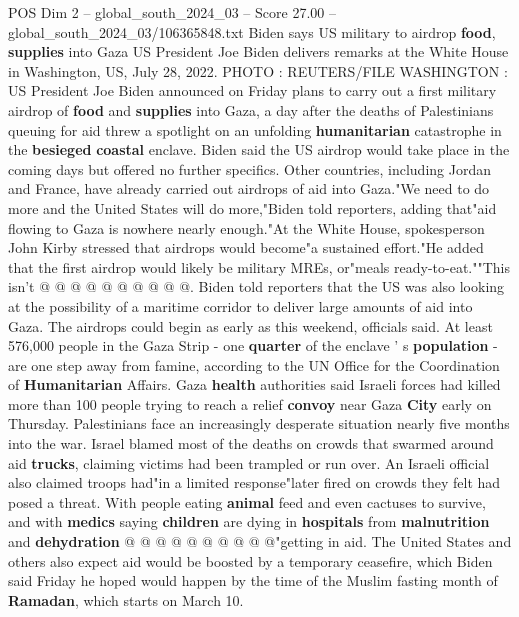 \begin{textsample}{POS Dim 2 – global\_south\_2024\_03 – Score 27.00 – global\_south\_2024\_03/106365848.txt}  \label{ex:f2_pos_010}
Biden says US military to airdrop \textbf{food}, \textbf{supplies} into Gaza US President Joe Biden delivers remarks at the White House in Washington, US, July 28, 2022.
PHOTO : REUTERS/FILE WASHINGTON : US President Joe Biden announced on Friday plans to carry out a first military airdrop of \textbf{food} and \textbf{supplies} into Gaza, a day after the deaths of Palestinians queuing for aid threw a spotlight on an unfolding \textbf{humanitarian} catastrophe in the \textbf{besieged} \textbf{coastal} enclave.
Biden said the US airdrop would take place in the coming days but offered no further specifics.
Other countries, including Jordan and France, have already carried out airdrops of aid into Gaza."We need to do more and the United States will do more,"Biden told reporters, adding that"aid flowing to Gaza is nowhere nearly enough."At the White House, spokesperson John Kirby stressed that airdrops would become"a sustained effort."He added that the first airdrop would likely be military MREs, or"meals ready-to-eat.""This isn't @ @ @ @ @ @ @ @ @ @.
Biden told reporters that the US was also looking at the possibility of a maritime corridor to deliver large amounts of aid into Gaza.
The airdrops could begin as early as this weekend, officials said.
At least 576,000 people in the Gaza Strip - one \textbf{quarter} of the enclave ' s \textbf{population} - are one step away from famine, according to the UN Office for the Coordination of \textbf{Humanitarian} Affairs.
Gaza \textbf{health} authorities said Israeli forces had killed more than 100 people trying to reach a relief \textbf{convoy} near Gaza \textbf{City} early on Thursday.
Palestinians face an increasingly desperate situation nearly five months into the war.
Israel blamed most of the deaths on crowds that swarmed around aid \textbf{trucks}, claiming victims had been trampled or run over.
An Israeli official also claimed troops had"in a limited response"later fired on crowds they felt had posed a threat.
With people eating \textbf{animal} feed and even cactuses to survive, and with \textbf{medics} saying \textbf{children} are dying in \textbf{hospitals} from \textbf{malnutrition} and \textbf{dehydration} @ @ @ @ @ @ @ @ @ @"getting in aid.
The United States and others also expect aid would be boosted by a temporary ceasefire, which Biden said Friday he hoped would happen by the time of the Muslim fasting month of \textbf{Ramadan}, which starts on March 10.

\end{textsample}
